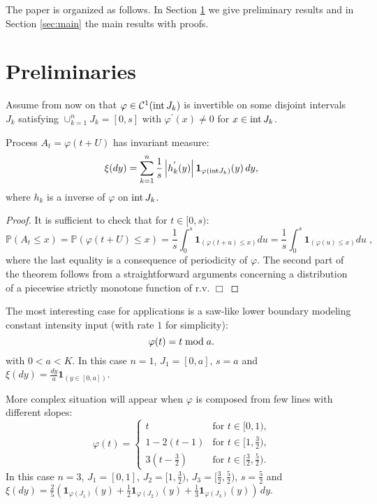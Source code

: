 \documentclass{aptpub}
\begin{document}
The paper is organized as follows. In Section \ref{sec:pr} we give preliminary results and in Section \ref{sec:main} the main results with proofs.

\section{Preliminaries}\label{sec:pr}

Assume from now on that
$\varphi\in \mathcal{C}^1({\rm int}\, J_k)$ is invertible on some disjoint intervals $J_k$ satisfying $\cup_{k=1}^n J_k=[0,s]$ with $\varphi^\prime(x)\neq 0$ for $x\in {\rm int}\, J_k$.

\begin{lem}
Process $A_t=\varphi(t+U)$ has invariant measure:
$$\xi(dy)=\sum_{k=1}^n\frac{1}{s}\left|h^{'}_k(y)\right|\mathbf{1}_{\varphi({\rm int} J_k)}(y)\,dy,$$ where $h_k$ is a inverse of $\varphi$ on ${\rm int}\, J_k$.
\end{lem}
\begin{proof} It is sufficient to check that for $t\in [0,s)$:
\begin{equation}
\mathbb{P}(A_t\leq x)=\mathbb{P}(\varphi(t+U)\leq x)=\frac{1}{s}\int_0^s\mathbf{1}_{(\varphi(t+u)\leq x)}du
=\frac{1}{s}\int_0^s\mathbf{1}_{(\varphi(u)\leq x)}du\;,\label{ref}
\end{equation}
where the last equality is a consequence of periodicity of $\varphi$.
The second part of the theorem follows from a straightforward arguments concerning a distribution of a piecewise strictly monotone function of r.v.
{\newline\vspace{3mm}\hfill $\Box$}\end{proof}

\begin{ex}
The most interesting case for applications is a saw-like lower boundary modeling constant intensity input (with rate $1$ for simplicity):
\begin{equation}\label{saw}\varphi(t)=
t\;{\rm mod}\; a.
\end{equation}
with $0<a<K$. In this case $n=1$, $J_1=[0,a]$, $s=a$ and $\xi(dy)=\frac{dy}{a}\mathbf{1}_{(y\in[0,a])}$.
\end{ex}

\begin{ex}
More complex situation will appear when $\varphi$ is composed from few lines with different slopes:
\begin{equation}\label{exvarphi2}\varphi(t)=\left\{
\begin{array}{lr}
t& \mbox{for $t\in[0,1)$,}\\
1-2(t-1)&\mbox{for $t\in [1, \frac{3}{2})$,}\\
3\left(t-\frac{3}{2}\right)&\mbox{for $t\in [\frac{3}{2}, \frac{5}{2})$.}
\end{array}\right.
\end{equation}
In this case $n=3$, $J_1=[0,1]$, $J_2=[1, \frac{3}{2})$, $J_3=[\frac{3}{2}, \frac{5}{2})$, $s=\frac{5}{2}$ and $\xi(dy)=
\frac{2}{5}\left(\mathbf{1}_{\varphi(J_1)}(y)+\frac{1}{2}\mathbf{1}_{\varphi(J_2)}(y)+\frac{1}{3}\mathbf{1}_{\varphi(J_3)}(y)\right)\,dy.$
\end{ex}
\end{document}

